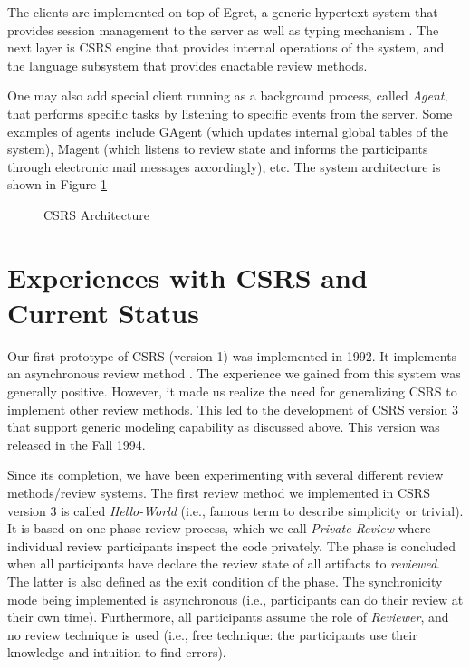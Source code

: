 The clients are implemented on top of Egret, a generic hypertext system
that provides session management to the server as well as typing
mechanism \cite{csdl-92-01,csdl-93-09}. The next layer is CSRS engine
that provides internal 
operations of the system, and the language subsystem that provides
enactable review methods.

One may also add special client running as a background process,
called {\it Agent}, that performs specific 
tasks by listening to specific events from the server.
Some examples of agents include GAgent (which updates internal global
tables of the system), Magent (which listens to review state
and informs the participants through electronic mail messages
accordingly), etc.  
The system architecture is shown in Figure \ref{fig:csrs-architecture}

\begin{figure}[h]
  \begin{center}
  \end{center}
  \caption{CSRS Architecture}
  \label{fig:csrs-architecture}
\end{figure}


\section{Experiences with CSRS and Current Status}

Our first prototype of CSRS (version 1) was implemented in 1992.
It implements an asynchronous review
method \cite{Johnson93}. 
The experience we gained from this system was generally positive.
However, it made us realize the need
for generalizing CSRS to implement other review methods.  
This led to the development of CSRS version 3 that support generic
modeling capability as discussed above. This version was released in
the Fall 1994.

Since its completion, we have been experimenting with several different
review methods/review systems. The first review method we implemented
in CSRS version 3 is called {\it Hello-World} (i.e., famous term to 
describe simplicity or trivial). It is based on
one phase review process, which we call {\it Private-Review}
where individual review participants inspect the code privately. The
phase is concluded when all participants have declare the review state
of all artifacts to {\it reviewed}. The latter is also defined as the exit
condition of the phase. The 
synchronicity mode being implemented is asynchronous (i.e.,
participants can do their 
review at their own time). Furthermore, all participants assume the
role of {\it Reviewer}, and no review technique is used (i.e.,
free technique: the participants use their knowledge and intuition to
find errors). 

